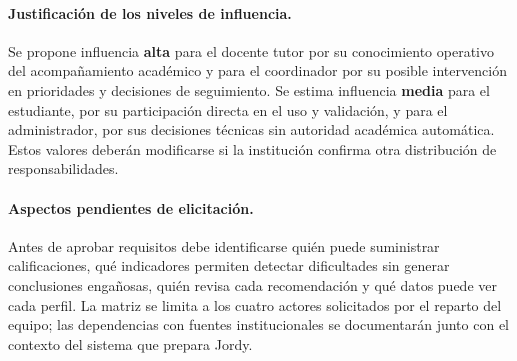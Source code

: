 \paragraph{Justificación de los niveles de influencia.}
Se propone influencia \textbf{alta} para el docente tutor por su conocimiento operativo del acompañamiento académico y para el coordinador por su posible intervención en prioridades y decisiones de seguimiento. Se estima influencia \textbf{media} para el estudiante, por su participación directa en el uso y validación, y para el administrador, por sus decisiones técnicas sin autoridad académica automática. Estos valores deberán modificarse si la institución confirma otra distribución de responsabilidades.

\paragraph{Aspectos pendientes de elicitación.}
Antes de aprobar requisitos debe identificarse quién puede suministrar calificaciones, qué indicadores permiten detectar dificultades sin generar conclusiones engañosas, quién revisa cada recomendación y qué datos puede ver cada perfil. La matriz se limita a los cuatro actores solicitados por el reparto del equipo; las dependencias con fuentes institucionales se documentarán junto con el contexto del sistema que prepara Jordy.
